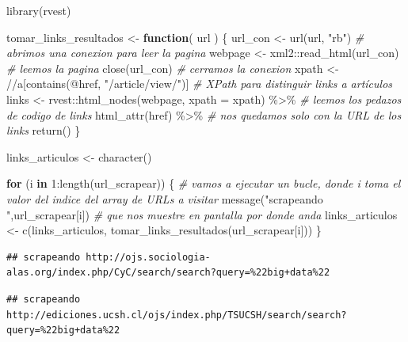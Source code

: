 \documentclass[
]{book}
\newenvironment{Shaded}{\begin{snugshade}}{\end{snugshade}}
\newcommand{\AttributeTok}[1]{\textcolor[rgb]{0.77,0.63,0.00}{#1}}
\newcommand{\CommentTok}[1]{\textcolor[rgb]{0.56,0.35,0.01}{\textit{#1}}}
\newcommand{\ControlFlowTok}[1]{\textcolor[rgb]{0.13,0.29,0.53}{\textbf{#1}}}
\newcommand{\DecValTok}[1]{\textcolor[rgb]{0.00,0.00,0.81}{#1}}
\newcommand{\FunctionTok}[1]{\textcolor[rgb]{0.00,0.00,0.00}{#1}}
\newcommand{\NormalTok}[1]{#1}
\newcommand{\OtherTok}[1]{\textcolor[rgb]{0.56,0.35,0.01}{#1}}
\newcommand{\SpecialCharTok}[1]{\textcolor[rgb]{0.00,0.00,0.00}{#1}}
\newcommand{\StringTok}[1]{\textcolor[rgb]{0.31,0.60,0.02}{#1}}
\begin{document}
\begin{Shaded}
\begin{Highlighting}[]
\FunctionTok{library}\NormalTok{(rvest)}

\NormalTok{tomar\_links\_resultados }\OtherTok{\textless{}{-}} \ControlFlowTok{function}\NormalTok{( url ) \{}
\NormalTok{  url\_con }\OtherTok{\textless{}{-}} \FunctionTok{url}\NormalTok{(url, }\StringTok{"rb"}\NormalTok{) }\CommentTok{\# abrimos una conexion para leer la pagina}
\NormalTok{  webpage }\OtherTok{\textless{}{-}}\NormalTok{ xml2}\SpecialCharTok{::}\FunctionTok{read\_html}\NormalTok{(url\_con) }\CommentTok{\# leemos la pagina}
  \FunctionTok{close}\NormalTok{(url\_con) }\CommentTok{\# cerramos la conexion}
\NormalTok{  xpath }\OtherTok{\textless{}{-}} \StringTok{\textquotesingle{}//a[contains(@href, "/article/view/")]\textquotesingle{}} \CommentTok{\# XPath para distinguir links a artículos}
\NormalTok{  links }\OtherTok{\textless{}{-}}\NormalTok{ rvest}\SpecialCharTok{::}\FunctionTok{html\_nodes}\NormalTok{(webpage, }\AttributeTok{xpath =}\NormalTok{ xpath) }\SpecialCharTok{\%\textgreater{}\%} \CommentTok{\# leemos los pedazos de codigo de links}
    \FunctionTok{html\_attr}\NormalTok{(}\StringTok{\textquotesingle{}href\textquotesingle{}}\NormalTok{) }\SpecialCharTok{\%\textgreater{}\%} \CommentTok{\# nos quedamos solo con la URL de los links}
    \FunctionTok{return}\NormalTok{()}
\NormalTok{\}}

\NormalTok{links\_articulos }\OtherTok{\textless{}{-}} \FunctionTok{character}\NormalTok{()}

\ControlFlowTok{for}\NormalTok{ (i }\ControlFlowTok{in} \DecValTok{1}\SpecialCharTok{:}\FunctionTok{length}\NormalTok{(url\_scrapear)) \{ }\CommentTok{\# vamos a ejecutar un bucle, donde i toma el valor del indice del array de URLs a visitar}
  \FunctionTok{message}\NormalTok{(}\StringTok{"scrapeando "}\NormalTok{,url\_scrapear[i]) }\CommentTok{\# que nos muestre en pantalla por donde anda}
\NormalTok{  links\_articulos }\OtherTok{\textless{}{-}} \FunctionTok{c}\NormalTok{(links\_articulos, }\FunctionTok{tomar\_links\_resultados}\NormalTok{(url\_scrapear[i]))}
\NormalTok{\}}
\end{Highlighting}
\end{Shaded}

\begin{verbatim}
## scrapeando http://ojs.sociologia-alas.org/index.php/CyC/search/search?query=%22big+data%22
\end{verbatim}

\begin{verbatim}
## scrapeando http://ediciones.ucsh.cl/ojs/index.php/TSUCSH/search/search?query=%22big+data%22
\end{verbatim}
\end{document}
